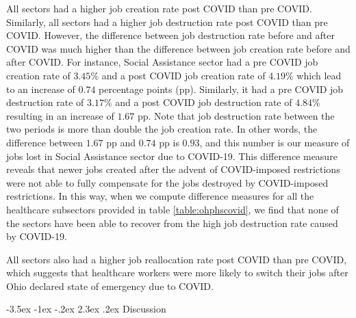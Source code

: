 \documentclass[11pt]{article}
\makeatletter
\renewcommand\section{\@startsection {section}{1}{\z@}%
                                       {-3.5ex \@plus -1ex \@minus -.2ex}%
                                       {2.3ex \@plus.2ex}%
                                       {\normalfont\fontfamily{phv}\fontsize{16}{19}\bfseries}}
\makeatother
\begin{document}
\noindent
All sectors had a higher job creation rate post COVID than pre COVID. Similarly, all sectors had a higher job destruction rate post COVID than pre COVID. However, the difference between job destruction rate before and after COVID was much higher than the difference between job creation rate before and after COVID. For instance, Social Assistance sector had a pre COVID job creation rate of $3.45\%$ and a post COVID job creation rate of $4.19\%$ which lead to an increase of $0.74$ percentage points (pp). Similarly, it had a pre COVID job destruction rate of $3.17\%$ and a post COVID job destruction rate of $4.84\%$ resulting in an increase of $1.67$ pp. Note that job destruction rate between the two periods is more than double the job creation rate. In other words, the difference between $1.67$ pp and $0.74$ pp is $0.93$, and this number is our measure of jobs lost in Social Assistance sector due to COVID-19. This difference measure reveals that newer jobs created after the advent of COVID-imposed restrictions were not able to fully compensate for the jobs destroyed by COVID-imposed restrictions. In this way, when we compute difference measures for all the healthcare subsectors provided in table \ref{table:ohphscovid}, we find that none of the sectors have been able to recover from the high job destruction rate caused by COVID-19.

\noindent
All sectors also had a higher job reallocation rate post COVID than pre COVID, which suggests that healthcare workers were more likely to switch their jobs after Ohio declared state of emergency due to COVID.


	
\section{Discussion} \label{s:discussion}
\end{document}

